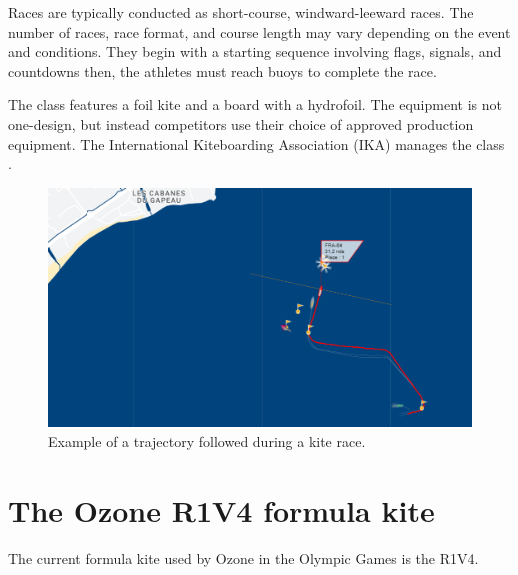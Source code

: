 
Races are typically conducted as short-course, windward-leeward races. The number of races, race format, and course length may vary depending on the event and conditions. They begin with a starting sequence involving flags, signals, and countdowns then, the athletes must reach buoys to complete the race.
\vspace{3cm}

The class features a foil kite and a board with a hydrofoil. The equipment is not one-design, but instead competitors use their choice of approved production equipment. The International Kiteboarding Association (IKA) manages the class \cite{formula_kite}.

\begin{figure}[H]
    \centering
    \includegraphics[width=1.\textwidth]{figures/introduction/suivi_course_kite_axel.png}
    \caption{Example of a trajectory followed during a kite race.}
    \label{fig:Example_of_a_trajectory_during_a_kite_race}
\end{figure}


\section{The Ozone R1V4 formula kite}
\label{sec:In1.4}

The current formula kite used by Ozone in the Olympic Games is the R1V4.


